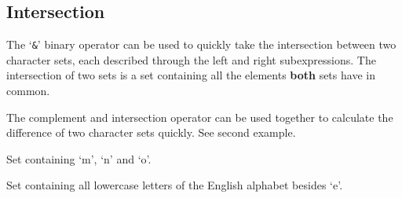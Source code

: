 
\subsection{Intersection}
{
	The `\texttt{\&}' binary operator can be used to quickly take the
	intersection between two character sets, each described through
	the left and right subexpressions. The intersection of two sets is
	a set containing all the elements \textbf{both} sets have in common.
	
	The complement and intersection operator can be used together to calculate
	the difference of two character sets quickly. See second example.
	
	\begin{itemize}
	{
		\item[\texttt{`a'-`o' \& `m'-`z'}] Set containing `m', `n' and `o'.
		
		\item[\texttt{`a'-`z' \& !{}`e'}] Set containing all lowercase letters
			of the English alphabet besides `e'.
	}
	\end{itemize}
}
